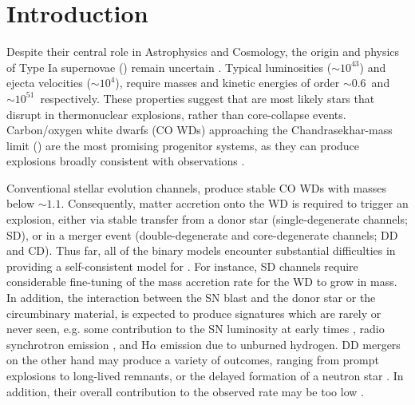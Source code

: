 \documentclass[twocolumn]{aa}
\begin{document}
\section{Introduction} \label{sec:intro}

 Despite their central role in Astrophysics and Cosmology, 
 the origin and physics of Type Ia supernovae (\ias)
remain uncertain  \citep[][]{Maoz:2013hna}. 
Typical \ia  luminosities ($\sim 10^{43}$\ergs) and ejecta velocities  
($ \sim 10^{4}$\kms), require   
masses and kinetic energies of order 
$\sim 0.6$\msun\ and $\sim 10^{51}$\erg\ respectively. 
 These properties suggest that \ias are most likely 
 stars that disrupt in  thermonuclear explosions, 
 rather than core-collapse events. 
 Carbon/oxygen white dwarfs (CO WDs) 
 approaching the Chandrasekhar-mass limit (\mch)
 are the most promising progenitor systems, as they can
 produce explosions broadly consistent with observations
 \citep{Nomoto:1982zz,Wang:2012za,Churazov:2014bga}. 
 
Conventional stellar evolution channels, produce stable CO WDs with masses below $\sim 1.1$\msun. 
Consequently, matter accretion onto the WD is required to trigger an 
explosion, either via stable  transfer from a 
donor star (single-degenerate channels; SD), or in a 
merger event (double-degenerate  and core-degenerate channels; DD and CD).  
Thus far, all of the  binary models    
encounter substantial difficulties in providing 
a self-consistent model for \ias \citep{Livio:2018rue}. 
For instance, SD channels require considerable fine-tuning
of the mass accretion rate for
the WD to grow in mass. In addition, the interaction between  
the SN blast and the donor star or the circumbinary material, is expected to produce  signatures which 
are rarely or never seen, e.g. some contribution to the SN  luminosity 
at early times \citep{Kasen:2009si}, radio synchrotron emission 
\citep{Harris:2016hfr}, and H$\alpha$ emission due to unburned hydrogen. 
DD mergers on the other hand may produce a variety of outcomes, 
ranging from prompt 
explosions to long-lived remnants, or the delayed formation of a neutron star \citep{Livio:2018rue}. 
In addition, their overall contribution to the observed \ia rate may be too low \citep{vanKerkwijk:2010he,claeys2014a,Sato:2015spa}. %
\end{document}
